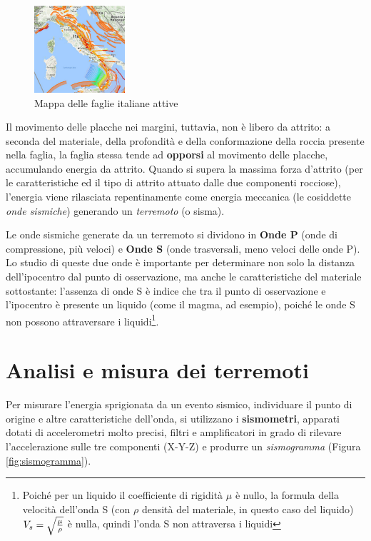 \documentclass[a4paper,10pt]{memoir}
\begin{document}
\begin{figure}
\caption{Mappa delle faglie italiane attive}
\label{fig:mappafaglie}
\includegraphics[width=0.30\textwidth]{introduzione/mappa_faglie_italiane2}
\end{figure}

Il movimento delle placche nei margini, tuttavia, non è libero da attrito: a seconda del materiale, della profondità e della conformazione della roccia presente nella faglia, la faglia stessa tende ad \textbf{opporsi} al movimento delle placche, accumulando energia da attrito. Quando si supera la massima forza d'attrito (per le caratteristiche ed il tipo di attrito attuato dalle due componenti rocciose), l'energia viene rilasciata repentinamente come energia meccanica (le cosiddette \textit{onde sismiche}) generando un \textit{terremoto} (o sisma).

Le onde sismiche generate da un terremoto si dividono in \textbf{Onde P} (onde di compressione, più veloci) e \textbf{Onde S} (onde trasversali, meno veloci delle onde P). Lo studio di queste due onde è importante per determinare non solo la distanza dell'ipocentro dal punto di osservazione, ma anche le caratteristiche del materiale sottostante: l'assenza di onde S è indice che tra il punto di osservazione e l'ipocentro è presente un liquido (come il magma, ad esempio), poiché le onde S non possono attraversare i liquidi\footnote{Poiché per un liquido il coefficiente di rigidità $\mu$ è nullo, la formula della velocità dell'onda S (con $\rho$ densità del materiale, in questo caso del liquido) $V_s = \sqrt{\mu \over \rho}$ è nulla, quindi l'onda S non attraversa i liquidi}.

\section{Analisi e misura dei terremoti}

Per misurare l'energia sprigionata da un evento sismico, individuare il punto di origine e altre caratteristiche dell'onda, si utilizzano i \textbf{sismometri}, apparati dotati di accelerometri molto precisi, filtri e amplificatori in grado di rilevare l'accelerazione sulle tre componenti (X-Y-Z) e produrre un \textit{sismogramma} (Figura \ref{fig:sismogramma}).
\end{document}
